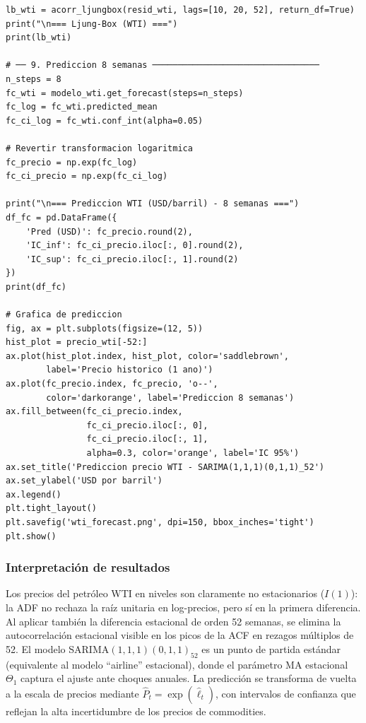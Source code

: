 \documentclass[12pt,a4paper]{article}
\begin{document}
\begin{lstlisting}[caption={Ejemplo 3: SARIMA para petróleo WTI semanal},label=lst:wti]
lb_wti = acorr_ljungbox(resid_wti, lags=[10, 20, 52], return_df=True)
print("\n=== Ljung-Box (WTI) ===")
print(lb_wti)

# ── 9. Prediccion 8 semanas ─────────────────────────────────
n_steps = 8
fc_wti = modelo_wti.get_forecast(steps=n_steps)
fc_log = fc_wti.predicted_mean
fc_ci_log = fc_wti.conf_int(alpha=0.05)

# Revertir transformacion logaritmica
fc_precio = np.exp(fc_log)
fc_ci_precio = np.exp(fc_ci_log)

print("\n=== Prediccion WTI (USD/barril) - 8 semanas ===")
df_fc = pd.DataFrame({
    'Pred (USD)': fc_precio.round(2),
    'IC_inf': fc_ci_precio.iloc[:, 0].round(2),
    'IC_sup': fc_ci_precio.iloc[:, 1].round(2)
})
print(df_fc)

# Grafica de prediccion
fig, ax = plt.subplots(figsize=(12, 5))
hist_plot = precio_wti[-52:]
ax.plot(hist_plot.index, hist_plot, color='saddlebrown',
        label='Precio historico (1 ano)')
ax.plot(fc_precio.index, fc_precio, 'o--',
        color='darkorange', label='Prediccion 8 semanas')
ax.fill_between(fc_ci_precio.index,
                fc_ci_precio.iloc[:, 0],
                fc_ci_precio.iloc[:, 1],
                alpha=0.3, color='orange', label='IC 95%')
ax.set_title('Prediccion precio WTI - SARIMA(1,1,1)(0,1,1)_52')
ax.set_ylabel('USD por barril')
ax.legend()
plt.tight_layout()
plt.savefig('wti_forecast.png', dpi=150, bbox_inches='tight')
plt.show()
\end{lstlisting}

\subsubsection{Interpretación de resultados}

Los precios del petróleo WTI en niveles son claramente no estacionarios ($I(1)$): la ADF no
rechaza la raíz unitaria en log-precios, pero sí en la primera diferencia. Al aplicar también
la diferencia estacional de orden 52 semanas, se elimina la autocorrelación estacional visible
en los picos de la ACF en rezagos múltiplos de 52. El modelo SARIMA$(1,1,1)(0,1,1)_{52}$ es
un punto de partida estándar (equivalente al modelo ``airline'' estacional), donde el parámetro
MA estacional $\Theta_1$ captura el ajuste ante choques anuales. La predicción se transforma
de vuelta a la escala de precios mediante $\hat{P}_t = \exp(\hat{\ell}_t)$, con intervalos
de confianza que reflejan la alta incertidumbre de los precios de commodities.

\end{document}
